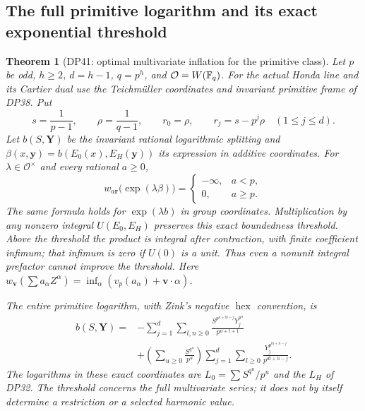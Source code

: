 \documentclass[11pt,a4paper]{article}
\newtheorem{theorem}{Theorem}[section]
\theoremstyle{definition}\newtheorem{remark}[theorem]{Remark}
\newcommand{\vp}{v_p}\newcommand{\dR}{\mathrm{dR}}\newcommand{\crys}{\mathrm{crys}}
\begin{document}
\subsection{The full primitive logarithm and its exact exponential threshold}

\begin{theorem}[DP41: optimal multivariate inflation for the primitive class]\label{DP41}
Let $p$ be odd, $h\ge2$, $d=h-1$, $q=p^h$, and $\mathcal O=W(\mathbb F_q)$. For the actual Honda line and its Cartier dual use the Teichm\"uller coordinates and invariant primitive frame of DP38. Put
\[
 s=\frac1{p-1},\qquad \rho=\frac1{q-1},\qquad
 r_0=\rho,\qquad r_j=s-p^j\rho\quad(1\le j\le d).
\]
Let $b(S,\mathbf Y)$ be the invariant rational logarithmic splitting and
$\beta(x,\mathbf y)=b(E_0(x),E_H(\mathbf y))$ its expression in additive coordinates. For $\lambda\in\mathcal O^\times$ and every rational $a\ge0$,
\[
 w_{a\mathbf r}\bigl(\exp(\lambda\beta)\bigr)=
 \begin{cases}-\infty,&a<p,\\0,&a\ge p.\end{cases}
\]
The same formula holds for $\exp(\lambda b)$ in group coordinates. Multiplication by any nonzero integral $U(E_0,E_H)$ preserves this exact boundedness threshold. Above the threshold the product is integral after contraction, with finite coefficient infimum; that infimum is zero if $U(0)$ is a unit. Thus even a nonunit integral prefactor cannot improve the threshold. Here $w_{\mathbf v}(\sum a_\alpha Z^\alpha)=\inf_\alpha(\vp(a_\alpha)+\mathbf v\cdot\alpha)$.

The entire primitive logarithm, with Zink's negative $\operatorname{hex}$ convention, is
\begin{equation}\label{eq:fullprimitive}
\begin{split}
 b(S,\mathbf Y)
 ={}&-\sum_{j=1}^d\sum_{l,n\ge0}
       \frac{S^{p^{n+lh+j}}Y_j^{p^n}}{p^{n+l+1}}\\
 &+\left(\sum_{u\ge0}\frac{S^{q^u}}{p^u}\right)
      \sum_{j=1}^d\sum_{l\ge0}
       \frac{Y_j^{p^{lh+h-j}}}{p^{dl+h-j}}.
\end{split}
\end{equation}
The logarithms in these exact coordinates are $L_0=\sum S^{q^u}/p^u$ and the $L_H$ of DP32. The threshold concerns the full multivariate series; it does not by itself determine a restriction or a selected harmonic value.
\end{theorem}
\end{document}
